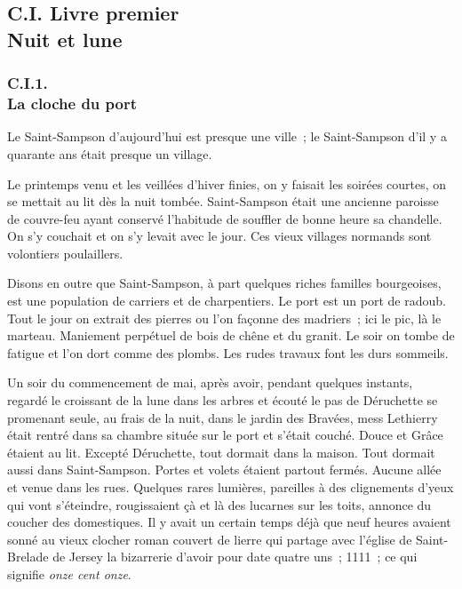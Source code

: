 \documentclass[french,twoside]{book} %
\begin{document}
  \subsection[{C.I. Livre premier. Nuit et lune}]{C.I. Livre premier \\
Nuit et lune}
  \subsubsection[{C.I.1. La cloche du port}]{C.I.1. \\
La cloche du port}
\noindent Le Saint-Sampson d’aujourd’hui est presque une ville ; le Saint-Sampson d’il y a quarante ans était presque un village.\par
Le printemps venu et les veillées d’hiver finies, on y faisait les soirées courtes, on se mettait au lit dès la nuit tombée. Saint-Sampson était une ancienne paroisse de couvre-feu ayant conservé l’habitude de souffler de bonne heure sa chandelle. On s’y couchait et on s’y levait avec le jour. Ces vieux villages normands sont volontiers poulaillers.\par
Disons en outre que Saint-Sampson, à part quelques riches familles bourgeoises, est une population de carriers et de charpentiers. Le port est un port de radoub. Tout le jour on extrait des pierres ou l’on façonne des madriers ; ici le pic, là le marteau. Maniement perpétuel de bois de chêne et du granit. Le soir  on tombe de fatigue et l’on dort comme des plombs. Les rudes travaux font les durs sommeils.\par
Un soir du commencement de mai, après avoir, pendant quelques instants, regardé le croissant de la lune dans les arbres et écouté le pas de Déruchette se promenant seule, au frais de la nuit, dans le jardin des Bravées, mess Lethierry était rentré dans sa chambre située sur le port et s’était couché. Douce et Grâce étaient au lit. Excepté Déruchette, tout dormait dans la maison. Tout dormait aussi dans Saint-Sampson. Portes et volets étaient partout fermés. Aucune allée et venue dans les rues. Quelques rares lumières, pareilles à des clignements d’yeux qui vont s’éteindre, rougissaient çà et là des lucarnes sur les toits, annonce du coucher des domestiques. Il y avait un certain temps déjà que neuf heures avaient sonné au vieux clocher roman couvert de lierre qui partage avec l’église de Saint-Brelade de Jersey la bizarrerie d’avoir pour date quatre uns ; 1111 ; ce qui signifie \emph{onze cent onze}.\par
\end{document}

